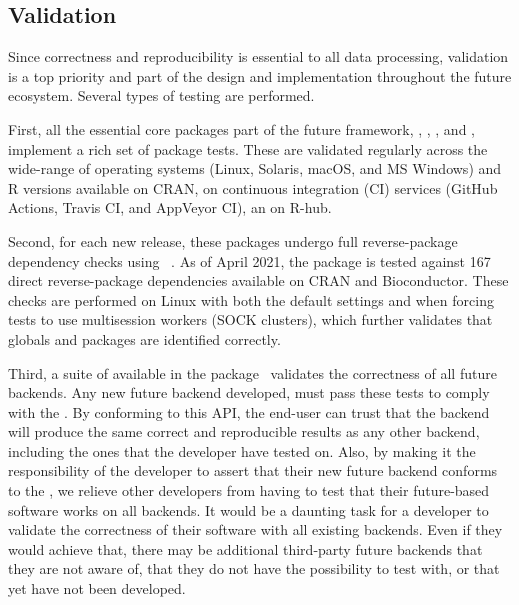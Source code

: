 \subsection{Validation}
\label{validation}

Since correctness and reproducibility is essential to all data
processing, validation is a top priority and part of the design and
implementation throughout the future ecosystem.  Several types of
testing are performed.

First, all the essential core packages part of the future framework,
, , , and ,
implement a rich set of package tests.  These are validated regularly
across the wide-range of operating systems (Linux, Solaris, macOS, and
MS Windows) and R versions available on CRAN, on continuous
integration (CI) services (GitHub Actions, Travis CI, and AppVeyor
CI), an on R-hub.

Second, for each new release, these packages undergo full
reverse-package dependency checks
using ~\citep{GitHub:revdepcheck}.  As of April 2021,
the  package is tested against 167 direct reverse-package
dependencies available on CRAN and Bioconductor.  These checks are
performed on Linux with both the default settings and when forcing
tests to use multisession workers (SOCK clusters), which further
validates that globals and packages are identified correctly.

Third, a suite of  available in the
 package~\citep{CRAN:future.tests} validates the
correctness of all future backends.  Any new future backend developed,
must pass these tests to comply with the .  By
conforming to this API, the end-user can trust that the backend will
produce the same correct and reproducible results as any other
backend, including the ones that the developer have tested on.  Also,
by making it the responsibility of the developer to assert that their
new future backend conforms to the , we relieve other
developers from having to test that their future-based software works
on all backends.  It would be a daunting task for a developer to
validate the correctness of their software with all existing
backends. Even if they would achieve that, there may be additional
third-party future backends that they are not aware of, that they do
not have the possibility to test with, or that yet have not been
developed.

